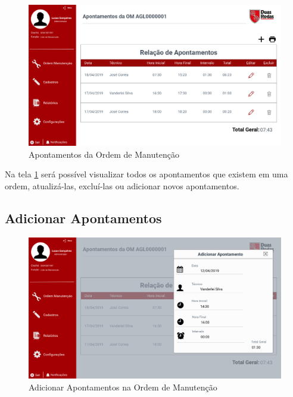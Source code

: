 {	\begin{figure}[htb]
		\caption{\label{web_om-apontamentos}Apontamentos da Ordem de Manutenção}
		\begin{center}
			\includegraphics[scale=0.40]{./Figuras/web/om-apontamentos.png}
		\end{center}
	\end{figure}
	
	Na tela \ref{web_om-apontamentos} será possível visualizar todos os apontamentos que existem em uma ordem, atualizá-las, excluí-las ou adicionar novos apontamentos.
	
	\newpage
	\subsection{Adicionar Apontamentos}
	
	\begin{figure}[htb]
		\caption{\label{web_om-add-apontamento}Adicionar Apontamentos na Ordem de Manutenção}
		\begin{center}
			\includegraphics[scale=0.40]{./Figuras/web/om-add-apontamento.png}
		\end{center}
	\end{figure}
	
}
